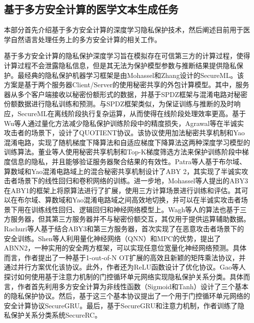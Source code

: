 

\subsection{基于多方安全计算的医学文本生成任务}

本部分首先介绍基于多方安全计算的深度学习隐私保护技术，然后阐述目前用于医学自然语言处理任务上的多方安全计算的相关工作。

基于多方安全计算的隐私保护深度学习旨在模拟存在可信第三方的计算过程，使得计算过程不会泄露隐私信息，但是其无法为保护模型参数与推断结果提供隐私保护。最经典的隐私保护机器学习框架是由Mohassel和Zhang设计的SecureML\cite{secureml}。该方案是基于两个服务器Client/Server的使用秘密共享的外包计算模型。其中，服务器从多个客户端接收以秘密份额形式的数据，并基于SPDZ框架\cite{spd}与混淆电路对秘密份额数据进行隐私训练和预测。与SPDZ框架类似，为保证训练与推断的及时响应，SecureML在离线阶段执行复杂运算，从而使得在线阶段处理效率更高。基于Wu等人\cite{wu2018training}通过量化方法减少隐私保护训练阶段中的精度损失，Agrawal等\cite{agrawal2019quotient}在半诚实攻击者的场景下，设计了QUOTIENT协议。该协议使用加法秘密共享机制和Yao混淆电路，实现了随机梯度下降算法和自适应梯度下降算法这两种深度学习模型的训练算法。董业等人\cite{FLSSGS}使用秘密共享机制和Top-K梯度筛选方法来保护训练阶段中梯度信息的隐私，并且能够验证服务器聚合结果的有效性。Patra等人\cite{patra2021aby2}基于布尔域、算数域和Yao混淆电路域上的混合秘密共享机制设计了ABY 2，其实现了半诚实攻击者场景下的线性回归和卷积网络的训练。进一步地，Mohassel\cite{mohassel2018aby3}等人提出的ABY3在ABY1\cite{demmler2015aby}的框架上将原算法进行了扩展，使用三方计算场景进行训练和评估。其可以在布尔域、算数域和Yao混淆电路域之间高效地切换，并可以在半诚实攻击者场景下用在训练线性回归、逻辑回归和神经网络模型上。Wagh等人\cite{SecureNN}的算法也基于三方服务器，但其第三方服务器并不与秘密份额交互，其仅用于提供运算辅助数据。Rachuri等人\cite{chaudhari2019trident}基于结合ABY3和第三方服务器，首次实现了在恶意攻击者场景下的安全训练。Shen等人\cite{shen2022abnn2}利用量化神经网络（QNN）和MPC的优势，提出了ABNN2，一种实用的安全两方框架，可以实现任意位宽量化神经网络预测。具体而言，作者提出了一种基于1-out-of-N OT扩展的高效且新颖的矩阵乘法协议，并通过并行方案优化该协议。此外，作者还为ReLU函数设计了优化协议。Gao等人\cite{gao2023securerc}探讨如何使用基于注意力机制的门控循环单元网络实现隐私保护关系分类。具体而言，作者首先利用多方安全计算为非线性函数（Sigmoid和Tanh）设计了三个基本的隐私保护协议。然后，基于这三个基本协议提出了一个用于门控循环单元网络的安全计算协议SecureGRU。最后，基于SecureGRU和注意力机制，作者训练了隐私保护关系分类系统SecureRC。

